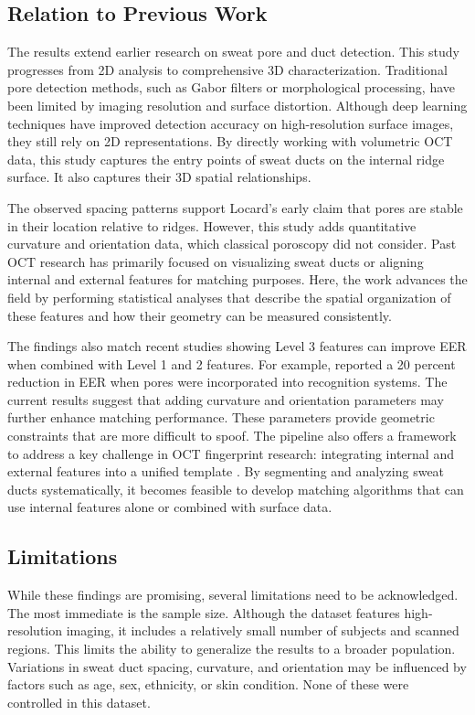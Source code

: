 \subsection{Relation to Previous Work}

The results extend earlier research on sweat pore and duct detection. This study progresses from 2D analysis to comprehensive 3D characterization. Traditional pore detection methods, such as Gabor filters or morphological processing, have been limited by imaging resolution and surface distortion. Although deep learning techniques have improved detection accuracy on high-resolution surface images, they still rely on 2D representations. By directly working with volumetric OCT data, this study captures the entry points of sweat ducts on the internal ridge surface. It also captures their 3D spatial relationships. 

The observed spacing patterns support Locard’s early claim that pores are stable in their location relative to ridges. However, this study adds quantitative curvature and orientation data, which classical poroscopy did not consider. Past OCT research has primarily focused on visualizing sweat ducts or aligning internal and external features for matching purposes. Here, the work advances the field by performing statistical analyses that describe the spatial organization of these features and how their geometry can be measured consistently. 

The findings also match recent studies showing Level 3 features can improve EER when combined with Level 1 and 2 features. For example, \textcite{jainPoresRidgesHighResolution2007} reported a 20 percent reduction in EER when pores were incorporated into recognition systems. The current results suggest that adding curvature and orientation parameters may further enhance matching performance. These parameters provide geometric constraints that are more difficult to spoof. The pipeline also offers a framework to address a key challenge in OCT fingerprint research: integrating internal and external features into a unified template \parencite{aliRobustBiometricAuthentication2020}. By segmenting and analyzing sweat ducts systematically, it becomes feasible to develop matching algorithms that can use internal features alone or combined with surface data.
\subsection{Limitations}

While these findings are promising, several limitations need to be acknowledged. The most immediate is the sample size. Although the dataset features high-resolution imaging, it includes a relatively small number of subjects and scanned regions. This limits the ability to generalize the results to a broader population. Variations in sweat duct spacing, curvature, and orientation may be influenced by factors such as age, sex, ethnicity, or skin condition. None of these were controlled in this dataset. 

